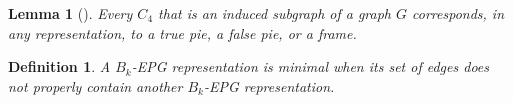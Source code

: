 \documentclass[
submission
]{dmtcs-episciences}
\newtheorem{lemma}[theorem]{Lemma}
\newtheorem{definition}[theorem]{Definition}
\begin{document}
\begin{lemma}[\cite{golumbic2009}]\label{lem:representacaoC4}
Every  $C_4$ that is an induced subgraph of a graph $ G $ corresponds, in any representation, to a true pie, a false pie, or a frame.
\end{lemma}




\begin{definition}
A $B_k$-EPG representation is \emph{minimal} 
when its set of edges  does not properly contain another $B_k$-EPG representation. 
\end{definition}
\end{document}
